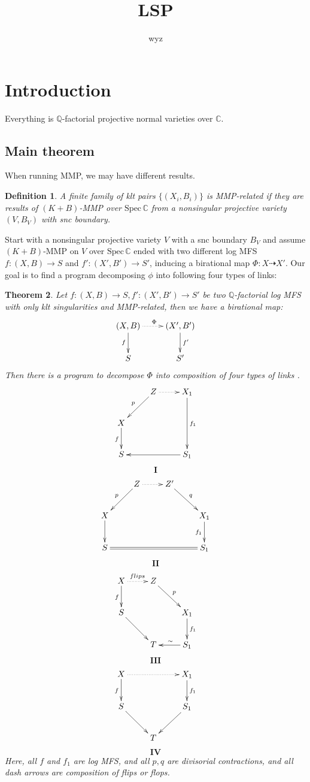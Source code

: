 \documentclass{article}
\title{LSP}
\author{wyz}
\date{}
\newtheorem{defn}{Definition}[section]
\newtheorem{thm}[defn]{Theorem}
\begin{document}
\maketitle
\tableofcontents
\newpage

\section{Introduction}

Everything is $ \mathbb{Q} $-factorial projective normal varieties over $ \mathbb{C} $.
\subsection{Main theorem}
When running MMP, we may have different results.
\begin{defn}
A finite family of klt pairs $ \{(X_i,B_i)\} $ is MMP-related if they are results of $ (K+B) $-MMP over $ \mathrm{Spec}\,\mathbb{C} $ from a nonsingular  projective variety $ (V,B_V) $ with snc boundary.
\end{defn}
Start with a nonsingular projective variety $ V $ with a snc boundary $ B_V $ and assume $ (K+B) $-MMP on $ V $ over $ \mathrm{Spec}\,\mathbb{C} $ ended with two different log MFS $ f:(X,B)\to S$ and  $f':(X',B')\to S' $, inducing a birational map $ \Phi:X\dashrightarrow X' $. Our goal is to find a program decomposing $ \phi $ into following four types of links:

\begin{thm}
Let $ f:(X,B)\to S,f':(X',B')\to S' $ be two $ \mathbb{Q} $-factorial log MFS  with only klt singularities and MMP-related, then we have a birational map:
$$ \xymatrix{
(X,B)\ar[d]_f\ar@{.>}[r]^\Phi&(X',B')\ar[d]^{f'}\\
S&S'} $$
Then there is a program to decompose $ \Phi  $ into composition of  four types of links .
$$ \xymatrix{
&Z\ar[ld]_p\ar@{.>}[r]&X_1\ar[dd]^{f_1}\\
X\ar[d]_f&&\\
S &&S_1\ar[ll]}$$
$$ \textbf{I} $$
$$ \xymatrix{
&Z\ar[ld]_p\ar@{.>}[r]&Z'\ar[dr]^{q}&\\
X\ar[d]&&&X_1\ar[d]_{f_1}\\
S\ar@{=}[rrr]&&&S_1} $$
$$ \textbf{II} $$
$$ \xymatrix{
X\ar[d]_f\ar@{.>}[r]^{flips}&Z\ar[rd]^{p}&\\
S\ar[dr]&&X_1\ar[d]^{f_1}\\
&T&S_1\ar[l]_\sim}$$
$$ \textbf{III} $$
$$ \xymatrix{
X\ar[d]_f\ar@{.>}[rr]&&X_1\ar[d]^{f_1}\\
S\ar[dr]&&S_1\ar[dl]\\
&T &}$$
$$ \textbf{IV} $$
Here, all $ f $ and $ f_1 $ are log MFS, and all $ p,q $ are divisorial contractions, and all dash arrows are composition of flips or flops. 
\end{thm}
\end{document}
